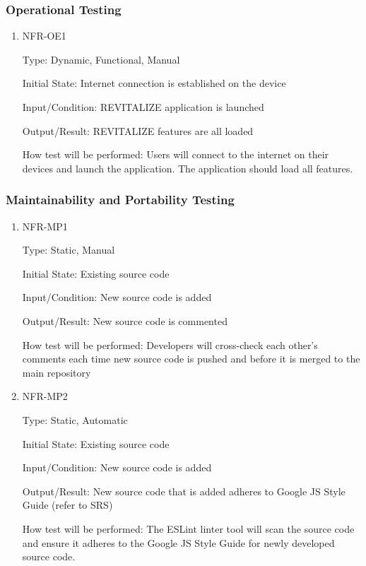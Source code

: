 \documentclass[12pt, titlepage]{article}
\begin{document}
\subsubsection{Operational Testing}

\begin{enumerate}
	
	\item{NFR-OE1\\}
	
	Type: Dynamic, Functional, Manual
	
	Initial State: Internet connection is established on the device
	
	Input/Condition: REVITALIZE application is launched
	
	Output/Result: REVITALIZE features are all loaded 
	
	How test will be performed: Users will connect to the internet on their devices and launch the application. The application should load all features. 
	
	
\end{enumerate}

\subsubsection{Maintainability and Portability Testing}

\begin{enumerate}
	
	\item{NFR-MP1\\}
	
	Type: Static, Manual
	
	Initial State: Existing source code
	
	Input/Condition: New source code is added
	
	Output/Result: New source code is commented  
	
	How test will be performed: Developers will cross-check each other's comments each time new source code is pushed and before it is merged to the main repository 
	
	\item{NFR-MP2\\}
	
	Type: Static, Automatic
	
	Initial State: Existing source code
	
	Input/Condition: New source code is added
	
	Output/Result: New source code that is added adheres to Google JS Style Guide (refer to SRS)
	
	How test will be performed: The ESLint linter tool will scan the source code and ensure it adheres to the Google JS Style Guide for newly developed source code.  
	
\end{enumerate}
\end{document}
